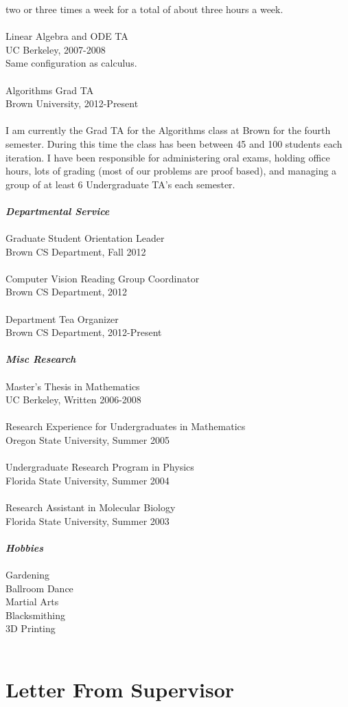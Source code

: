 \documentclass[12pt]{article}
\numberwithin{equation}{section}
\numberwithin{table}{section}
\numberwithin{figure}{section}
\begin{document}
two or three times a week for a total of about three hours a week.\\
 \\
Linear Algebra and ODE TA\\
UC Berkeley, 2007-2008\\
Same configuration as calculus.\\
 \\
Algorithms Grad TA\\
Brown University, 2012-Present\\
\\
I am currently the Grad TA for the Algorithms class at Brown for the fourth semester. During this time the class has been
between 45 and 100 students each iteration.  I have been responsible for administering oral exams, holding office hours,
lots of grading (most of our problems are proof based), and managing a group of at least 6 Undergraduate TA's each semester.\\
 \\
\textbf{\emph{Departmental Service}}\\
 \\
Graduate Student Orientation Leader\\
Brown CS Department, Fall 2012\\
 \\
Computer Vision Reading Group Coordinator\\
Brown CS Department, 2012\\
 \\
Department Tea Organizer\\
Brown CS Department, 2012-Present\\
 \\
\textbf{\emph{Misc Research}}\\
 \\
Master's Thesis in Mathematics\\
UC Berkeley, Written 2006-2008\\
 \\
Research Experience for Undergraduates in Mathematics\\
Oregon State University, Summer 2005\\
 \\
Undergraduate Research Program in Physics\\
Florida State University, Summer 2004\\
 \\
Research Assistant in Molecular Biology\\
Florida State University, Summer 2003\\
 \\
\textbf{\emph{Hobbies}}\\
 \\
Gardening\\
Ballroom Dance\\
Martial Arts\\
Blacksmithing\\
3D Printing\\
 \\
\newpage

\section{Letter From Supervisor}

\newpage
\end{document}
